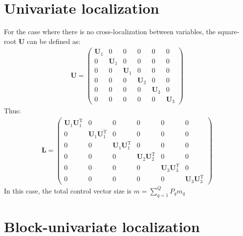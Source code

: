 \documentclass[12pt]{scrartcl}
\begin{document}
\section{Univariate localization}
For the case where there is no cross-localization between variables, the square-root $\mathbf{U}$ can be defined as:
\begin{align}
\mathbf{U} = \left( \begin{array}{ccc|c|cc}
\mathbf{U}_1 & 0 & 0 & 0 & 0 & 0 \\
0 & \mathbf{U}_1 & 0 & 0 & 0 & 0 \\
0 & 0 & \mathbf{U}_1 & 0 & 0 & 0 \\[0.3ex]
\hline
0 & 0 & 0 & \mathbf{U}_2 & 0 & 0 \\[0.3ex]
\hline
0 & 0 & 0 & 0 & \mathbf{U}_3 & 0 \\
0 & 0 & 0 & 0 & 0 & \mathbf{U}_3
\end{array} \right)
\end{align}
Thus:
\begin{align}
\mathbf{L} = \left( \begin{array}{ccc|c|cc}
\mathbf{U}_1 \mathbf{U}_1^\mathrm{T} & 0 & 0 & 0 & 0 & 0 \\
0 & \mathbf{U}_1 \mathbf{U}_1^\mathrm{T} & 0 & 0 & 0 & 0 \\
0 & 0 & \mathbf{U}_1 \mathbf{U}_1^\mathrm{T} & 0 & 0 & 0 \\[0.3ex]
\hline
0 & 0 & 0 & \mathbf{U}_2 \mathbf{U}_2^\mathrm{T} & 0 & 0 \\[0.3ex]
\hline
0 & 0 & 0 & 0 & \mathbf{U}_3 \mathbf{U}_3^\mathrm{T} & 0 \\
0 & 0 & 0 & 0 & 0 & \mathbf{U}_3 \mathbf{U}_3^\mathrm{T}
\end{array} \right)
\end{align}
In this case, the total control vector size is $\displaystyle m = \sum_{q=1}^Q P_q m_q$

\section{Block-univariate localization}
\end{document}
